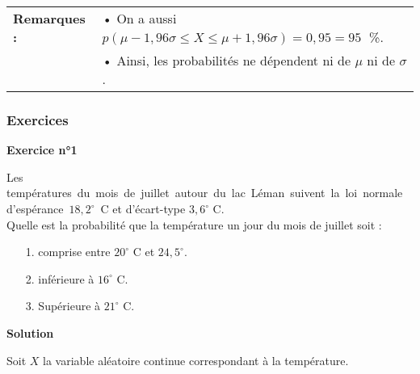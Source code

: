 \vspace*{.3cm}

\begin{tabular}{ll}
\hspace{-.3cm} \textbf{Remarques :} & • On a aussi $p\left(\mu -1,96\sigma \leqslant X \leqslant \mu + 1,96 \sigma\right) = 0,95 = 95 \; $ \%. \vspace*{.3cm} \\
& • Ainsi, les probabilités ne dépendent ni de $\mu$ ni de $\sigma$. 
\end{tabular}

\newpage

\vspace*{-1.7cm}

\subsubsection{Exercices}

\textbf{Exercice n°1} 

Les \hbox{températures du mois de juillet autour du lac Léman suivent la loi normale d'espérance $18,2^{\circ}$ C} et d'écart-type $3,6^{\circ}$ C. \\

Quelle est la probabilité que la température un jour du mois de juillet soit : \\

\begin{itemize}
\item[1.] comprise entre $20^{\circ}$ C et $24,5^{\circ}$. 
\item[2.] inférieure à $16^{\circ}$ C. 
\item[3.] Supérieure à $21^{\circ}$ C. 
\end{itemize}

\vspace*{.3cm}

\textbf{Solution} 

Soit $X$ la variable aléatoire continue correspondant à la température. \\

